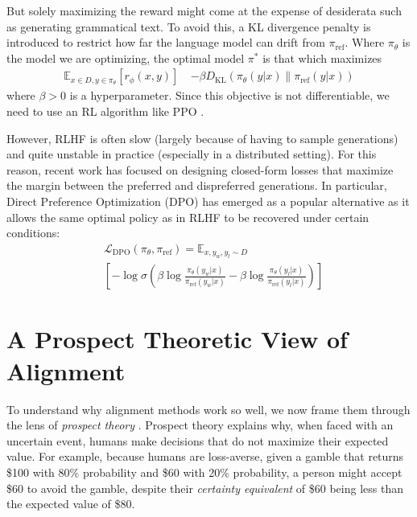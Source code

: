 But solely maximizing the reward might come at the expense of desiderata such as generating grammatical text. 
To avoid this, a KL divergence penalty is introduced to restrict how far the language model can drift from $\pi_\text{ref}$. 
Where $\pi_\theta$ is the model we are optimizing, the optimal model $\pi^*$ is that which maximizes
\begin{equation}
\begin{split}
    \mathbb{E}_{x \in D, y \in \pi_\theta} [r_\phi(x,y)] \
    & - \beta D_{\text{KL}}(\pi_\theta(y|x) \| \pi_{\text{ref}}(y|x)) 
    \label{eq:rlhf_obj}
\end{split}
\end{equation}
where $\beta > 0$ is a hyperparameter. 
Since this objective is not differentiable, we need to use an RL algorithm like PPO \citep{schulman2017proximal}.

However, RLHF is often slow (largely because of having to sample generations) and quite unstable in practice (especially in a distributed setting).
For this reason, recent work has focused on designing closed-form losses that maximize the margin between the preferred and dispreferred generations.
In particular, Direct Preference Optimization (DPO) \citep{rafailov2023direct} has emerged as a popular alternative as it allows the same optimal policy as in RLHF to be recovered under certain conditions:
\begin{equation}
\begin{split}
    & \mathcal{L}_\text{DPO}(\pi_\theta, \pi_\text{ref}) = \mathbb{E}_{x,y_w,y_l \sim D} \\ & \left[  -\log \sigma \left( \beta \log \frac{\pi_\theta(y_w|x)}{\pi_\text{ref}(y_w|x)} - \beta \log \frac{\pi_\theta(y_l|x)}{\pi_\text{ref}(y_l|x)} \right) \right]
\end{split}
\label{eq:dpo}
\end{equation}

\section{A Prospect Theoretic View of Alignment}

To understand why alignment methods work so well, we now frame them through the lens of \textit{prospect theory} \citep{tversky1992advances}.
Prospect theory explains why, when faced with an uncertain event, humans make decisions that do not maximize their expected value.
For example, because humans are loss-averse, given a gamble that returns \$100 with 80\% probability and \$60 with 20\% probability, a person might accept \$60 to avoid the gamble, despite their \textit{certainty equivalent} of \$60 being less than the expected value of \$80.

